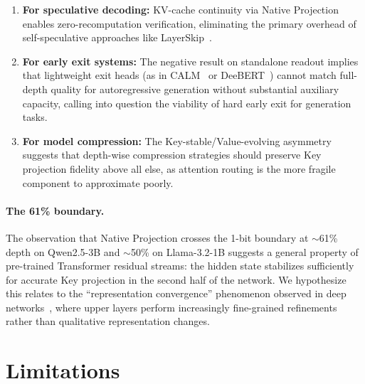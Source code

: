 \documentclass{article}
\begin{document}
\begin{enumerate}[nosep,leftmargin=*]
    \item \textbf{For speculative decoding:} KV-cache continuity via Native Projection enables zero-recomputation verification, eliminating the primary overhead of self-speculative approaches like LayerSkip~\cite{elhoushi2024layerskip}.
    
    \item \textbf{For early exit systems:} The negative result on standalone readout implies that lightweight exit heads (as in CALM~\cite{schuster2022confident} or DeeBERT~\cite{xin2020deebert}) cannot match full-depth quality for autoregressive generation without substantial auxiliary capacity, calling into question the viability of hard early exit for generation tasks.
    
    \item \textbf{For model compression:} The Key-stable/Value-evolving asymmetry suggests that depth-wise compression strategies should preserve Key projection fidelity above all else, as attention routing is the more fragile component to approximate poorly.
\end{enumerate}

\paragraph{The 61\% boundary.}
The observation that Native Projection crosses the 1-bit boundary at $\sim$61\% depth on Qwen2.5-3B and $\sim$50\% on Llama-3.2-1B suggests a general property of pre-trained Transformer residual streams: the hidden state stabilizes sufficiently for accurate Key projection in the second half of the network. We hypothesize this relates to the ``representation convergence'' phenomenon observed in deep networks~\cite{raghu2017svcca}, where upper layers perform increasingly fine-grained refinements rather than qualitative representation changes.

\section{Limitations}
\label{sec:limitations}
\end{document}
